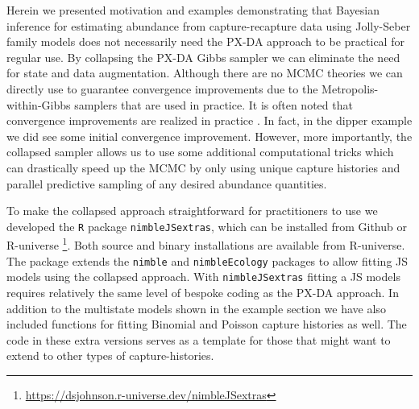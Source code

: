 \documentclass[11pt]{article}
\begin{document}
Herein we presented motivation and examples demonstrating that Bayesian inference for estimating abundance from capture-recapture data using Jolly-Seber family models does not necessarily need the PX-DA approach to be practical for regular use. By collapsing the PX-DA Gibbs sampler we can eliminate the need for state and data augmentation. Although there are no MCMC theories we can directly use to guarantee convergence improvements due to the Metropolis-within-Gibbs samplers that are used in practice. It is often noted that convergence improvements are realized in practice \citep{VanDykJiao2015a}. In fact, in the dipper example we did see some initial convergence improvement. However, more importantly, the collapsed sampler allows us to use some additional computational tricks which can drastically speed up the MCMC by only using unique capture histories and parallel predictive sampling of any desired abundance quantities. 

To make the collapsed approach straightforward for practitioners to use we developed the {\tt R} package {\tt nimbleJSextras}, which can be installed from Github or R-universe \footnote{\url{https://dsjohnson.r-universe.dev/nimbleJSextras}}. Both source and binary installations are available from R-universe. The package extends the {\tt nimble} and {\tt nimbleEcology} packages to allow fitting JS models using the collapsed approach. With {\tt nimbleJSextras} fitting a JS models requires relatively the same level of bespoke  coding as the PX-DA approach. In addition to the multistate models shown in the example section we have also included functions for fitting Binomial and Poisson capture histories as well. The code in these extra versions serves as a template for those that might want to extend to other types of capture-histories. 
\end{document}
